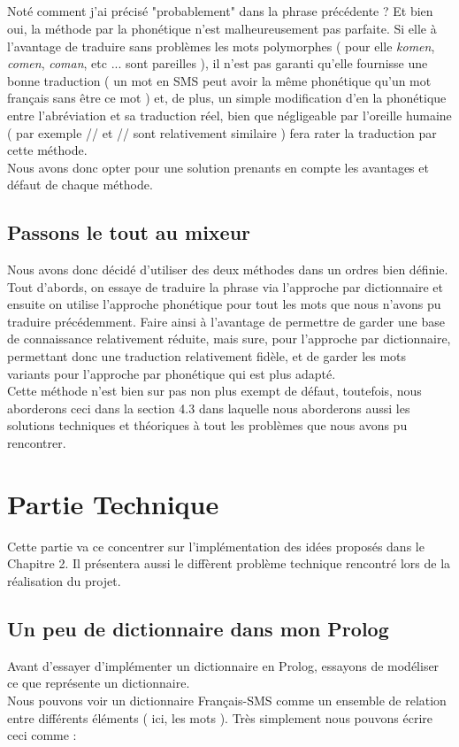 \documentclass[11pt]{book}
\begin{document}
	\paragraph{} Noté comment j'ai précisé "probablement" dans la phrase précédente ? Et bien oui, la méthode par la phonétique n'est malheureusement pas parfaite. Si elle à l'avantage de traduire sans problèmes les mots polymorphes ( pour elle {\em komen}, {\em comen}, {\em coman}, etc ... sont pareilles ), il n'est pas garanti qu'elle fournisse une bonne traduction ( un mot en SMS peut avoir la même phonétique qu'un mot français sans être ce mot ) et, de plus, un simple modification d'en la phonétique entre l'abréviation et sa traduction réel, bien que négligeable par l'oreille humaine ( par exemple // et // sont relativement similaire ) fera rater la traduction par cette méthode.\\
	Nous avons donc opter pour une solution prenants en compte les avantages et défaut de chaque méthode.
	
	\section{Passons le tout au mixeur}
	Nous avons donc décidé d'utiliser des deux méthodes dans un ordres bien définie. Tout d'abords, on essaye de traduire la phrase via l'approche par dictionnaire et ensuite on utilise l'approche phonétique pour tout les mots que nous n'avons pu traduire précédemment. Faire ainsi à l'avantage de permettre de garder une base de connaissance relativement réduite, mais sure, pour l'approche par dictionnaire, permettant donc une traduction relativement fidèle, et de garder les mots variants pour l'approche par phonétique qui est plus adapté.\\
	Cette méthode n'est bien sur pas non plus exempt de défaut, toutefois, nous aborderons ceci dans la section 4.3 dans laquelle nous aborderons aussi les solutions techniques et théoriques à tout les problèmes que nous avons pu rencontrer.

\chapter{Partie Technique}
Cette partie va ce concentrer sur l'implémentation des idées proposés dans le Chapitre 2. Il présentera aussi le diffèrent problème technique rencontré lors de la réalisation du projet.

	\section{Un peu de dictionnaire dans mon Prolog}
	Avant d'essayer d'implémenter un dictionnaire en Prolog, essayons de modéliser ce que représente un dictionnaire.\\
	Nous pouvons voir un dictionnaire Français-SMS comme un ensemble de relation entre différents éléments ( ici, les mots ). Très simplement nous pouvons écrire ceci comme :\\
	\smallskip
	
\end{document}
